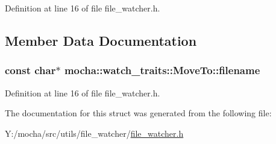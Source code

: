 Definition at line 16 of file file\_\-watcher.h.



\subsection{Member Data Documentation}
\hypertarget{structmocha_1_1watch__traits_1_1_move_to_a6e2117968f0c33d82dc6e9b162c3eda9}{
\subsubsection[{filename}]{\setlength{\rightskip}{0pt plus 5cm}const char$\ast$ {\bf mocha::watch\_\-traits::MoveTo::filename}}}
\label{structmocha_1_1watch__traits_1_1_move_to_a6e2117968f0c33d82dc6e9b162c3eda9}


Definition at line 16 of file file\_\-watcher.h.



The documentation for this struct was generated from the following file:\begin{DoxyCompactItemize}
\item 
Y:/mocha/src/utils/file\_\-watcher/\hyperlink{file__watcher_8h}{file\_\-watcher.h}\end{DoxyCompactItemize}
